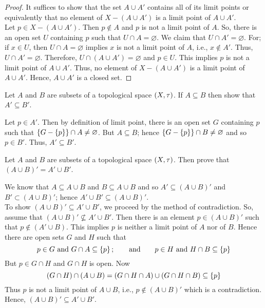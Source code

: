 \documentclass[../main-sheet.tex]{subfiles}
\begin{document}
\begin{proof}
    It suffices to show that the set  \(A \cup A'\) contains all of its limit points or equivalently that no element of  \(X - (A\cup A')\) is a limit point of  \(A \cup A'\).\\
    Let  \(p \in X - (A\cup A')\). Then  \(p \notin A\) and  \(p\) is not a limit point of  \(A\). So, there is an open set  \(U\) containing  \(p\) such that  \(U \cap A = \varnothing\). We claim that  \(U \cap A'= \varnothing\). For; if  \(x\in U\), then  \(U\cap A=\varnothing\) implies  \(x\) is not a limit point of  \(A\), i.e.,  \(x \notin A'\). Thus,  \(U \cap A'=\varnothing\). Therefore,  \(U \cap (A \cup A') = \varnothing\) and  \(p \in U\). This implies  \(p\) is not a
    limit point of  \(A \cup A'\). Thus, no element of  \(X - (A \cup A')\) is a limit
    point of  \(A\cup A'\). Hence,  \(A \cup A'\) is a closed set.
\end{proof}
\begin{prob}
    Let  \(A\) and  \(B\) are subsets of a topological space  \((X, \tau)\). If  \(A \subseteq B\) then show that  \(A' \subseteq B'\).
\end{prob}
\begin{soln}
    Let  \(p \in A'\). Then by definition of limit point, there is
    an open set  \(G\) containing  \(p\) such that  \(\left\{G-\left\{p\right\}\right\}\cap A\neq\varnothing\). But  \(A\subseteq B\); hence  \(\left\{G - \left\{p\right\}\right\}\cap B\neq \varnothing\) and so  \(p \in B'\). Thus,  \(A' \subseteq B'\).
\end{soln}
\begin{prob}
    Let  \(A\) and  \(B\) are subsets of a topological space
     \((X, \tau)\). Then prove that  \((A \cup B)' = A' \cup B'\).
\end{prob}
\begin{soln}
    We know that  \(A \subseteq A \cup B\) and  \(B \subseteq A \cup B\) and so  \(A' \subseteq(A \cup B)'\) and  \(B' \subset (A\cup B)'\); hence   \(A' \cup B' \subseteq (A \cup B)'\).\\
    To show  \((A\cup B)'\subseteq A'\cup B'\), we proceed by the method of contradiction. So, assume that  \((A \cup B)'\nsubseteq  A' \cup B'\). Then there is an element  \(p \in (A \cup B)'\) such that  \(p\notin(A'\cup B)\). This implies  \(p\) is neither a limit point of  \(A\) nor of  \(B\). Hence there are open sets  \(G\)
    and  \(H\) such that
    \[p\in G \text{ and } G \cap A \subseteq \left\{p\right\};\qquad \text{and}\qquad p \in H \text{ and } H \cap B\subseteq \left\{p\right\}\]
    But  \(p\in G\cap H\) and  \(G \cap H\) is open. Now
    \[(G\cap H)\cap(A\cup B)=(G\cap H\cap A)\cup(G\cap H\cap B)\subseteq \left\{p\right\}\]
    Thus  \(p\) is not a limit point of  \(A\cup B\), i.e.,  \(p\notin (A \cup B)'\) which is a contradiction. Hence,  \((A \cup B)' \subseteq A'\cup B'\).
\end{soln}
\end{document}
